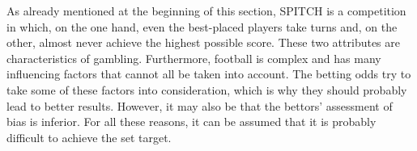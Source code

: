 As already mentioned at the beginning of this section, SPITCH is a competition in which, on the one hand, even the best-placed players take turns and, on the other, almost never achieve the highest possible score. These two attributes are characteristics of gambling. Furthermore, football is complex and has many influencing factors that cannot all be taken into account. The betting odds try to take some of these factors into consideration, which is why they should probably lead to better results. However, it may also be that the bettors' assessment of bias is inferior. For all these reasons, it can be assumed that it is probably difficult to achieve the set target. 

